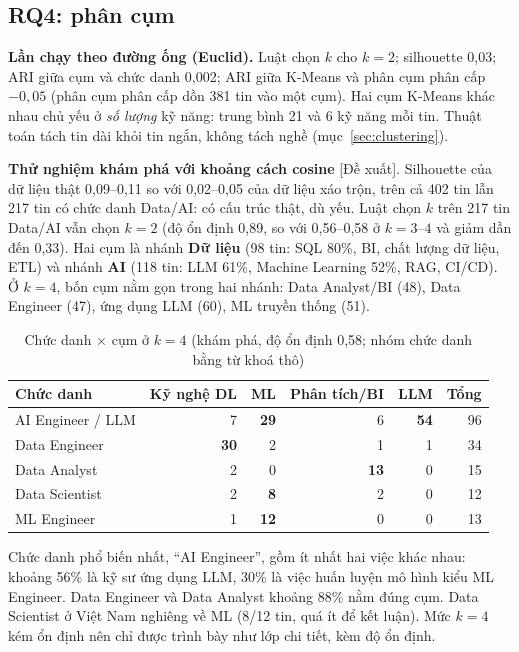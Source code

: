 \documentclass[12pt]{article}
\newcommand{\dexuat}{\textsf{[Đề xuất]}}
\begin{document}
\subsection{RQ4: phân cụm}
\label{sec:res-rq4}

\textbf{Lần chạy theo đường ống (Euclid).} Luật chọn $k$ cho $k = 2$; silhouette 0,03; ARI giữa cụm và chức danh 0,002; ARI giữa K-Means và phân cụm phân cấp $-0{,}05$ (phân cụm phân cấp dồn 381 tin vào một cụm). Hai cụm K-Means khác nhau chủ yếu ở \textit{số lượng} kỹ năng: trung bình 21 và 6 kỹ năng mỗi tin. Thuật toán tách tin dài khỏi tin ngắn, không tách nghề (mục~\ref{sec:clustering}).

\textbf{Thử nghiệm khám phá với khoảng cách cosine} \dexuat{}. Silhouette của dữ liệu thật 0,09--0,11 so với 0,02--0,05 của dữ liệu xáo trộn, trên cả 402 tin lẫn 217 tin có chức danh Data/AI: có cấu trúc thật, dù yếu. Luật chọn $k$ trên 217 tin Data/AI vẫn chọn $k = 2$ (độ ổn định 0,89, so với 0,56--0,58 ở $k = 3$--$4$ và giảm dần đến 0,33). Hai cụm là nhánh \textbf{Dữ liệu} (98 tin: SQL 80\%, BI, chất lượng dữ liệu, ETL) và nhánh \textbf{AI} (118 tin: LLM 61\%, Machine Learning 52\%, RAG, CI/CD). Ở $k = 4$, bốn cụm nằm gọn trong hai nhánh: Data Analyst/BI (48), Data Engineer (47), ứng dụng LLM (60), ML truyền thống (51).

\begin{table}[htbp]
\centering
\caption{Chức danh $\times$ cụm ở $k = 4$ (khám phá, độ ổn định 0,58; nhóm chức danh bằng từ khoá thô)}
\label{tab:crosstab}
\renewcommand{\arraystretch}{1.15}
\small
\begin{tabular}{l r r r r r}
\toprule
\textbf{Chức danh} & \textbf{Kỹ nghệ DL} & \textbf{ML} & \textbf{Phân tích/BI} & \textbf{LLM} & \textbf{Tổng} \\
\midrule
AI Engineer / LLM & 7 & \textbf{29} & 6 & \textbf{54} & 96 \\
Data Engineer & \textbf{30} & 2 & 1 & 1 & 34 \\
Data Analyst & 2 & 0 & \textbf{13} & 0 & 15 \\
Data Scientist & 2 & \textbf{8} & 2 & 0 & 12 \\
ML Engineer & 1 & \textbf{12} & 0 & 0 & 13 \\
\bottomrule
\end{tabular}
\end{table}

Chức danh phổ biến nhất, ``AI Engineer'', gồm ít nhất hai việc khác nhau: khoảng 56\% là kỹ sư ứng dụng LLM, 30\% là việc huấn luyện mô hình kiểu ML Engineer. Data Engineer và Data Analyst khoảng 88\% nằm đúng cụm. Data Scientist ở Việt Nam nghiêng về ML (8/12 tin, quá ít để kết luận). Mức $k = 4$ kém ổn định nên chỉ được trình bày như lớp chi tiết, kèm độ ổn định.
\end{document}
